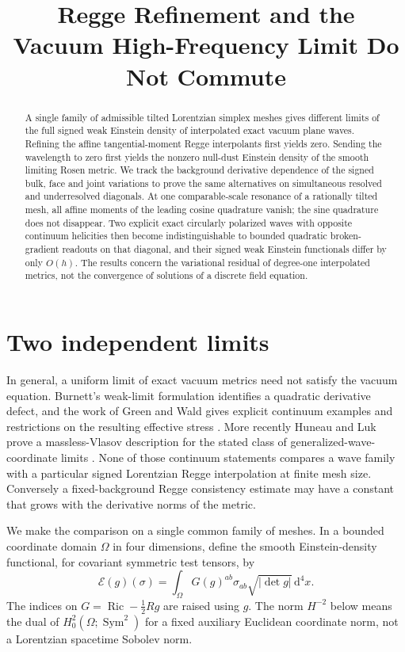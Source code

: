 \documentclass[11pt]{article}
\title{Regge Refinement and the\\Vacuum High-Frequency Limit Do Not Commute}
\author{}
\date{}
\DeclareMathOperator{\Ric}{Ric}
\newcommand{\dd}{\mathrm d}
\newcommand{\Ecal}{\mathcal E}
\begin{document}
\maketitle

\begin{abstract}
A single family of admissible tilted Lorentzian simplex meshes gives
different limits of the full signed weak Einstein density of
interpolated exact vacuum plane waves. Refining the affine
tangential-moment Regge interpolants first yields zero. Sending the
wavelength to zero first yields the nonzero null-dust Einstein
density of the smooth limiting Rosen metric. We track the background
derivative dependence of the signed bulk, face and joint variations
to prove the same alternatives on simultaneous resolved and
underresolved diagonals. At one comparable-scale resonance of a
rationally tilted mesh, all affine moments of the leading cosine
quadrature vanish; the sine quadrature does not disappear. Two
explicit exact circularly polarized waves with opposite continuum
helicities then become indistinguishable to bounded quadratic
broken-gradient readouts on that diagonal, and their signed weak Einstein
functionals differ by only \(O(h)\). The results concern the
variational residual of degree-one interpolated metrics, not the
convergence of solutions of a discrete field equation.
\end{abstract}

\section{Two independent limits}

In general, a uniform limit of exact vacuum metrics need not satisfy
the vacuum equation. Burnett's weak-limit formulation identifies a
quadratic derivative defect, and the work of Green and Wald gives
explicit continuum examples and restrictions on the resulting
effective stress \cite{Burnett,GreenWald}. More recently Huneau and
Luk prove a massless-Vlasov description for the stated class of
generalized-wave-coordinate limits \cite{HuneauLuk}. None of those
continuum statements compares a wave family with a particular
signed Lorentzian Regge interpolation at finite mesh size.
Conversely a fixed-background Regge consistency estimate may have
a constant that grows with the derivative norms of the metric.

We make the comparison on a single common family of meshes. In a
bounded coordinate domain \(\Omega\) in four dimensions, define
the smooth Einstein-density functional, for covariant
symmetric test tensors, by
\begin{equation}
 \Ecal(g)(\sigma)=\int_\Omega G(g)^{ab}\sigma_{ab}
                            \sqrt{|\det g|}\,\dd^4x .
 \label{eq:smooth}
\end{equation}
The indices on \(G=\Ric-\tfrac12 Rg\) are raised using \(g\).
The norm \(H^{-2}\) below means the dual of
\(H^2_0(\Omega;\operatorname{Sym}^2)\) for a fixed auxiliary Euclidean
coordinate norm, not a Lorentzian spacetime Sobolev norm.
\end{document}
